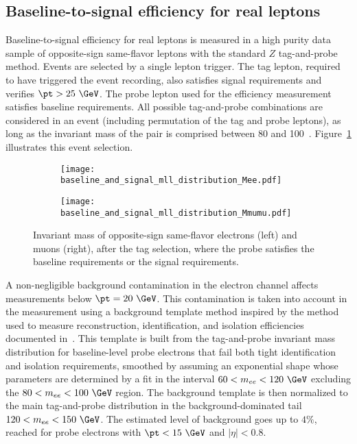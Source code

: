 \subsection*{Baseline-to-signal efficiency for real leptons}
\label{subsubsec:fakes_matrix_real_efficiency}


Baseline-to-signal efficiency for real leptons is measured in a high purity data sample of opposite-sign same-flavor leptons with the standard $Z$ tag-and-probe method.
Events are selected by a single lepton trigger.
The tag lepton, required to have triggered the event recording, also satisfies signal requirements and verifies $\pt>25~\GeV$. 
The probe lepton used for the efficiency measurement satisfies baseline requirements. 
All possible tag-and-probe combinations are considered in an event (including permutation of the tag and probe leptons), 
as long as the invariant mass of the pair is comprised between 80 and 100~\GeV. 
Figure~\ref{fig:RLE_mll_distribution} illustrates this event selection.

\begin{figure}[t!]
\centering
\begin{subfigure}[b]{0.45\textwidth}
	\texttt{[image: baseline\_and\_signal\_mll\_distribution\_Mee.pdf]}
\end{subfigure}
\begin{subfigure}[b]{0.45\textwidth}
	\texttt{[image: baseline\_and\_signal\_mll\_distribution\_Mmumu.pdf]}
\end{subfigure}
\caption{Invariant mass of opposite-sign same-flavor electrons (left) and muons (right), after the tag selection, 
where the probe satisfies the baseline requirements or the signal requirements.}
\label{fig:RLE_mll_distribution}
\end{figure}

A non-negligible background contamination in the electron channel affects measurements below $\pt=20~\GeV$. 
This contamination is taken into account in the measurement using a background template method inspired by the method used to measure reconstruction, identification, and 
isolation efficiencies documented in~\cite{ATLAS-CONF-2014-032}. 
This template is built from the tag-and-probe invariant mass distribution for baseline-level probe electrons that fail both tight identification
 and isolation requirements, smoothed by assuming an exponential shape whose parameters are determined by a fit in the interval $60<m_{ee}<120~\GeV$ excluding the $80<m_{ee}< 100~\GeV$ region. 
The background template is then normalized to the main tag-and-probe distribution in the background-dominated tail $120<m_{ee}<150~\GeV$. 
The estimated level of background goes up to $4\%$, reached for probe electrons with $\pt<15~\GeV$ and $|\eta|<0.8$. 

